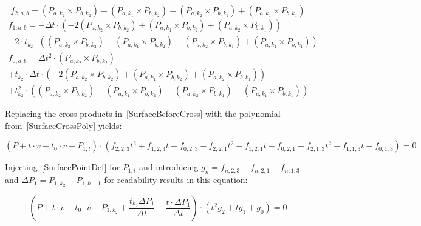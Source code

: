 \begin{equation}\label{SurfaceFStart}
    f_{2, a, b} = (P_{a, k_2} \times P_{b, k_2})
    - (P_{a, k_1} \times P_{b, k_2})
    - (P_{a, k_2} \times P_{b, k_1})
    + (P_{a, k_1} \times P_{b, k_1})
\end{equation}
\begin{equation}
    \begin{split}
        f_{1, a, b} = - \Delta t \cdot (
        - 2 (P_{a, k_2} \times P_{b, k_2})
        + (P_{a, k_1} \times P_{b, k_2})
        + (P_{a, k_2} \times P_{b, k_1})
        )
        \\
        - 2 \cdot t_{k_2} \cdot (
        (P_{a, k_2} \times P_{b, k_2})
        - (P_{a, k_1} \times P_{b, k_2})
        - (P_{a, k_2} \times P_{b, k_1})
        + (P_{a, k_1} \times P_{b, k_1})
        )
    \end{split}
\end{equation}
\begin{equation}\label{SurfaceFEnd}
    \begin{split}
        f_{0, a, b} = \Delta t^2 \cdot (P_{a, k_2} \times P_{b, k_2})
        \\
        + t_{k_2} \cdot \Delta t \cdot (
        - 2 (P_{a, k_2} \times P_{b, k_2})
        + (P_{a, k_1} \times P_{b, k_2})
        + (P_{a, k_2} \times P_{b, k_1})
        )
        \\
        + t_{k_2}^2 \cdot (
        (P_{a, k_2} \times P_{b, k_2})
        - (P_{a, k_1} \times P_{b, k_2})
        - (P_{a, k_2} \times P_{b, k_1})
        + (P_{a, k_1} \times P_{b, k_1})
        )
    \end{split}
\end{equation}

Replacing the cross products in~\eqref{SurfaceBeforeCross} with the polynomial from~\eqref{SurfaceCrossPoly} yields:

\begin{equation*}
    (P + t \cdot v - t_0 \cdot v - P_{1, t}) \cdot
    (f_{2, 2, 3} t^2 + f_{1, 2, 3} t + f_{0, 2, 3} - f_{2, 2, 1} t^2 - f_{1, 2, 1} t - f_{0, 2, 1} - f_{2, 1, 3} t^2 - f_{1, 1, 3} t - f_{0, 1, 3})
    = 0
\end{equation*}

Injecting~\eqref{SurfacePointDef} for \(P_{1, t}\) and
introducing \(g_n = f_{n, 2, 3} - f_{n, 2, 1} - f_{n, 1, 3}\)
and \(\Delta P_1 = P_{1, k_2} - P_{1, k-1}\) for readability
results in this equation:

\begin{equation}\label{SurfaceAfterCross}
    (
    P + t \cdot v - t_0 \cdot v - P_{1, k_2}
    + \frac{t_{k_2} \Delta P_1}{\Delta t}
    - \frac{t \cdot \Delta P_1}{\Delta t}
    ) \cdot
    (
    t^2 g_2
    + t g_1
    + g_0
    )
    = 0
\end{equation}

